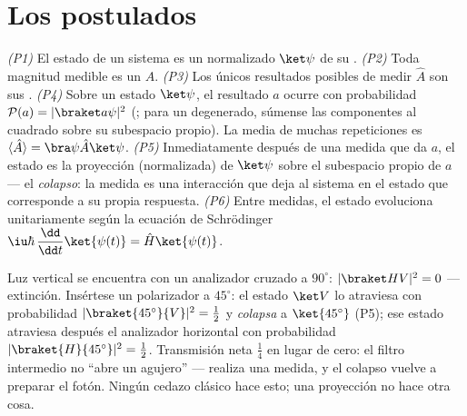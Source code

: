 \section{Los postulados}

\begin{theorem}\label{thm:b3:quantum-formalism:postulates}
\emph{(P1)} El estado de un sistema es un  normalizado $\ket\psi$ de su
.
\emph{(P2)} Toda magnitud medible es un 
$\hat A$.
\emph{(P3)} Los únicos resultados posibles de medir $\hat A$ son sus
.
\emph{(P4)} Sobre un estado $\ket\psi$, el resultado $a$ ocurre con
probabilidad $\mathcal P(a) = |\braket a\psi|^2$ (; para un
 degenerado, súmense las componentes al cuadrado sobre su
subespacio propio). La media de muchas repeticiones es $\langle\hat A\rangle =
\bra\psi\hat A\ket\psi$.
\emph{(P5)} Inmediatamente después de una medida que da $a$, el estado es
la proyección (normalizada) de $\ket\psi$ sobre el subespacio propio de $a$
--- el \emph{colapso}: la medida es una interacción que deja al sistema en
el estado que corresponde a su propia respuesta.
\emph{(P6)} Entre medidas, el estado evoluciona unitariamente según la
ecuación de Schrödinger
$\iu\hbar\,\dfrac{\dd}{\dd t}\ket{\psi(t)} = \hat H\ket{\psi(t)}$.
\end{theorem}
\admitted

\begin{example}\label{ex:b3:quantum-formalism:threepolarizers}
Luz vertical se encuentra con un analizador cruzado a $90^\circ$: $|\braket
HV|^2 = 0$ --- extinción. Insértese un polarizador a $45^\circ$: el estado
$\ket V$ lo atraviesa con probabilidad $|\braket{45^\circ}{V}|^2 =
\tfrac12$ y \emph{colapsa} a $\ket{45^\circ}$ (P5); ese estado
atraviesa después el analizador horizontal con probabilidad
$|\braket{H}{45^\circ}|^2 = \tfrac12$. Transmisión neta $\tfrac14$
en lugar de cero: el filtro intermedio no ``abre un agujero'' --- realiza
una medida, y el colapso vuelve a preparar el fotón. Ningún cedazo clásico
hace esto; una proyección no hace otra cosa.
\end{example}


